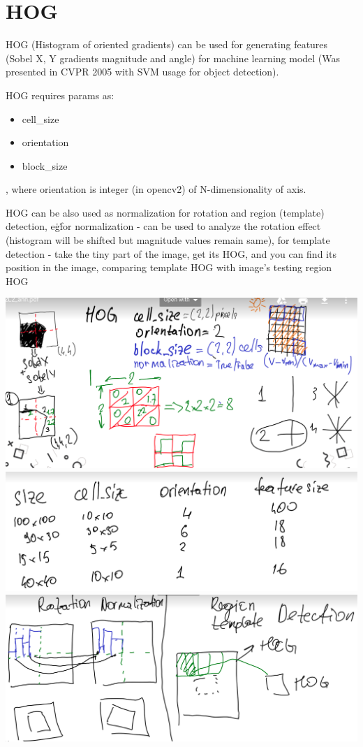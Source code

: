 \documentclass[11pt]{article}
\begin{document}
    \section{HOG}

    HOG (Histogram of oriented gradients) can be used for generating features (Sobel X, Y gradients magnitude and angle)
    for machine learning model (Was presented in CVPR 2005 with SVM usage for object detection).

    HOG requires params as:
    \begin{itemize}
        \item cell\_size
        \item orientation
        \item block\_size
    \end{itemize}

    , where orientation is integer (in opencv2) of N-dimensionality of axis.

    HOG can be also used as normalization for rotation and region (template) detection, e\.g\. for normalization -
    can be used to analyze the rotation effect (histogram will be shifted but magnitude values remain same),
    for template detection - take the tiny part of the image, get its HOG, and you can find its position in the image,
    comparing template HOG with image's testing region HOG

    \includegraphics[scale=0.2]{hog}
    \includegraphics[scale=0.2]{hog_feature}
    \includegraphics[scale=0.2]{hog_usage}
\end{document}

